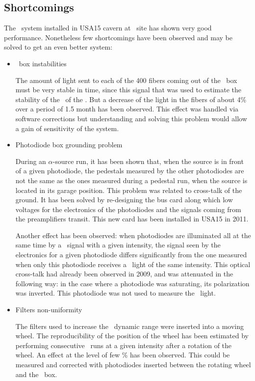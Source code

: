 \subsection{Shortcomings}
The \las~system installed in USA15 cavern at \atlas~site has shown very good performance. Nonetheless few shortcomings have been observed and may be solved to get an even better system:
\begin{itemize}
\item{\coimbra~box instabilities} 
	
The amount of light sent to each of the 400 fibers coming out of the \coimbra~box must be very stable in time, since this signal that was used to estimate the stability of the \pmts~of the \tilecal. But a decrease of the light in the fibers of about 4\% over a period of 1.5 month has been observed. This effect was handled via software corrections but understanding and solving this problem would allow a gain of sensitivity of the system.
	
\item{Photodiode box grounding problem} 
	
During an $\alpha$-source run, it has been shown that, when the source is in front of a given photodiode, the pedestals measured by the other photodiodes are not the same as the ones measured during a pedestal run, when the source is located in its garage position. This problem was related to cross-talk of the ground. It has been solved by re-designing the bus card along which low voltages for the electronics of the photodiodes and the signals coming from the preamplifiers transit. This new card has been installed in USA15 in 2011. \par
Another effect has been observed: when photodiodes are illuminated all at the same time by a \las~signal with a given intensity, the signal seen by the electronics for a given photodiode differs significantly from the one measured when only this photodiode receives a \las~light of the same intensity. This optical cross-talk had already been observed in 2009, and was attenuated in the following way: in the case where a photodiode was saturating, its polarization was inverted. This photodiode was not used to measure the  \las~light. 
		
\item{Filters non-uniformity}
	
The filters used to increase the \las~dynamic range were inserted into a moving wheel. The reproducibility of the position of the wheel has been estimated by performing consecutive \las~runs at a given intensity after a rotation of the wheel. An effect at the level of few \% has been observed. This could be measured and corrected with photodiodes inserted between the rotating wheel and the \coimbra~box.
	

\end{itemize}
